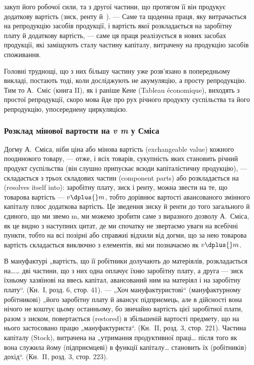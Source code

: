\parcont{}  %
закуп його робочої сили, та з другої частини, що протягом її він продукує
додаткову вартість (зиск, ренту й~). — Саме та щоденна праця,
яку витрачається на репродукцію засобів продукції, і вартість якої
розкладається на заробітну плату й додаткову вартість, — саме ця праця
реалізується в нових засобах продукції, які заміщують сталу частину
капіталу, витрачену на продукцію засобів споживання.

Головні труднощі, що з них більшу частину уже розв’язано в попередньому
викладі, постають тоді, коли досліджують не акумуляцію, а просту
репродукцію. Тим то А.~Сміс (книга II), як і раніше Кене (Tableau
économique), виходять з простої репродукції, скоро мова йде про рух
річного продукту суспільства та його репродукцію, упосереднену циркуляцією.

\subsubsection[]{Розклад мінової вартости на \emph{v \dplus{} m} у Сміса}

Догму А.~Сміса, ніби ціна або мінова вартість (exchangeable value)
кожного поодинокого товару, — отже, і всіх товарів, сукупність яких
становить річний продукт суспільства (він слушно припускає всюди капіталістичну
продукцію), — складається з трьох складових частин (component
parts) або розкладається на (resolves itself into): заробітну плату,
зиск і ренту, можна звести на те, що товарова вартість — $v \dplus{} m$, тобто
дорівнює вартості авансованого змінного капіталу плюс додаткова вартість.
Це зведення зиску й ренти до того загального й єдиного, що
ми звемо m, ми можемо зробити саме з виразного дозволу А.~Сміса, як
це видно з наступних цитат, де ми спочатку не звертаємо уваги на всебічні
пункти, тобто на всі позірні або справжні відхили від догми, що за
нею товарова вартість складається виключно з елементів, які ми позначаємо
як $v \dplus{} m$.

В мануфактурі „вартість, що її робітники долучають до матеріялів,
розкладається на\dots{}\dots{} дві частини, що з них одна оплачує їхню заробітну
плату, а друга — зиск їхньому хазяїнові на ввесь капітал, авансований ним
на матеріял і на заробітну плату“. (Кн.~І, розд. 6, стор. 41). — „Хоч
мануфактуристові“ (мануфактурному робітникові) „його заробітну плату
й авансує підприємець, але в дійсності вона нічого не коштує цьому
останньому, бо звичайно вартість цієї заробітної плати, разом з зиском,
повертається (restored) в збільшеній вартості предмету, що на нього застосовано
працю „мануфактуриста“. (Кн.~II, розд. 3, стор. 221). Частина капіталу
(Stock), витрачена на „утримання продуктивної праці\dots{} після того як вона
служила йому (підприємцеві) в функції капіталу\dots{} становить їх (робітників)
дохід“. (Кн.~II, розд. 3, стор. 223).

